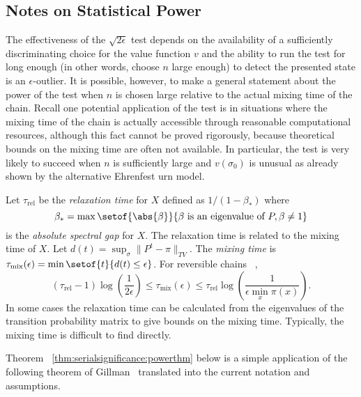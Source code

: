 \documentclass[12pt]{article}
\begin{document}
\subsection*{Notes on Statistical Power}

The effectiveness of the \( \sqrt{2\epsilon} \) test depends on the
availability of a sufficiently discriminating choice for the value
function \( v \) and the ability to run the test for long enough (in
other words, choose \( n \) large enough) to detect the presented state
is an \( \epsilon \)-outlier.  It is possible, however, to make a
general statement about the power of the test when \( n \) is chosen
large relative to the actual mixing time of the chain.  Recall one
potential application of the test is in situations where the mixing time
of the chain is actually accessible through reasonable computational
resources, although this fact cannot be proved rigorously, because
theoretical bounds on the mixing time are often not available.  In
particular, the test is very likely to succeed when \( n \) is
sufficiently large and \( v(\sigma_0) \) is unusual as already shown by
the alternative Ehrenfest urn model.

\begin{remark}
    Let \( \tau_{\text{rel}} \) be the \emph{relaxation time}%
    for \( X \) defined as \( 1/ (1-\beta_*) \) where
    \[
        \beta_* = \max \setof{\abs{\beta}}{ \beta \text{ is an
        eigenvalue of } P, \beta \ne 1 }
    \] is the \emph{absolute spectral gap} for \( X \).  The relaxation
    time is related to the mixing time of \( X \).  Let \( d(t) = \sup_{\sigma}
    \| P^t - \pi \|_{TV} \).  The \emph{mixing time} is \( \tau_{\text{mix}}
    (\epsilon) = \min\setof{t}{d(t) \le \epsilon} \).  For reversible
    chains~%
    \cite[Theorems 12.3, 12.4]{levin09},
    \[
        (\tau_{\text{rel}}-1) \log \left( \frac{1}{2\epsilon} \right)
        \le \tau_{\text{mix}}(\epsilon) \le \tau_{\text{rel}} \log
        \left(\frac{1} {\epsilon \min_x \pi(x)} \right).
    \] In some cases the relaxation time can be calculated from the
    eigenvalues of the transition probability matrix to give bounds on
    the mixing time.  Typically, the mixing time is difficult to find
    directly.
\end{remark}

Theorem~%
\ref{thm:serialsignificance:powerthm} below is a simple application of
the following theorem of Gillman~%
\cite[Theorem 2.1]{gillman98} translated into the current notation and
assumptions.
\end{document}
